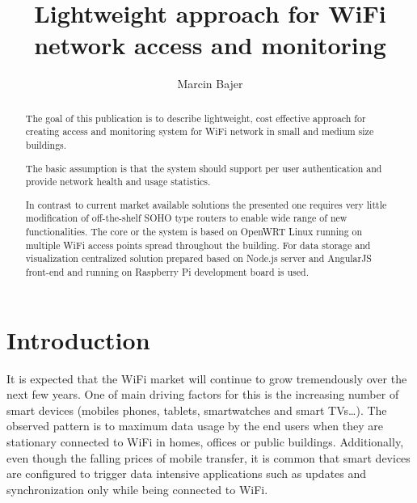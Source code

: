 \documentclass{llncs}
\begin{document}
\frontmatter          %

\pagestyle{headings}  %
\mainmatter              %
\title{Lightweight approach for WiFi network access and monitoring}
\author{Marcin Bajer}

%

\maketitle              %

\begin{abstract}
The goal of this publication is to describe lightweight, cost effective approach
for creating access and monitoring system for WiFi network in small and medium
size buildings.

The basic assumption is that the system should support per user
authentication and provide network health and usage statistics.

In contrast to current market available solutions the presented one requires
very little modification of off-the-shelf SOHO type routers to enable wide
range of new functionalities. The core or the system is based on OpenWRT Linux running
on multiple WiFi access points spread throughout the building.
For data storage and visualization centralized solution prepared
based on Node.js server and AngularJS front-end and running on Raspberry Pi
development board is used. 

\end{abstract}
%
\section{Introduction}
%

It is expected that the WiFi market will continue to grow tremendously over the
next few years. One of main driving factors for this is the increasing number of
smart devices (mobiles phones, tablets, smartwatches and smart TVs\ldots). The
observed pattern is to maximum data usage by the end users when they are
stationary connected to WiFi in homes, offices or public buildings.
Additionally, even though the falling prices of mobile transfer, it is common that
smart devices are configured to trigger data intensive applications such as
updates and synchronization only while being connected to WiFi.
\end{document}
